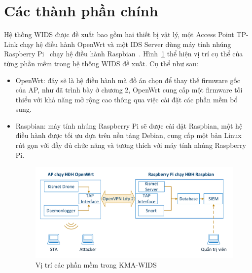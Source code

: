 \section{Các thành phần chính}
Hệ thống WIDS được đề xuất bao gồm hai thiết bị vật lý, một Access Point TP-Link chạy hệ điều hành OpenWrt và một IDS Server dùng máy tính nhúng Raspberry Pi~\cite{rasberry2017raspberry} chạy hệ điều hành Raspbian~\cite{raspberry2017raspbian}. Hình~\ref{fig:diagram-wids-new-components} thể hiện vị trí cụ thể của từng phần mềm trong hệ thống WIDS đề xuất. Cụ thể như sau:

\begin{itemize}
\item OpenWrt: đây sẽ là hệ điều hành mà đồ án chọn để thay thế firmware gốc của AP, như đã trình bày ở chương 2, OpenWrt cung cấp một firmware tối thiểu với khả năng mở rộng cao thông qua việc cài đặt các phần mềm bổ sung.
\item Raspbian: máy tính nhúng Raspberry Pi sẽ được cài đặt Raspbian, một hệ điều hành được tối ưu dựa trên nền tảng Debian, cung cấp một bản Linux rút gọn với đầy đủ chức năng và tương thích với máy tính nhúng Raspberry Pi.

\begin{figure}[H]
    \centering
    \includegraphics[width=1.0\textwidth]{diagram-wids-new-components}
    \caption{
        \label{fig:diagram-wids-new-components}
        Vị trí các phần mềm trong KMA-WIDS}
\end{figure}


\end{itemize}
